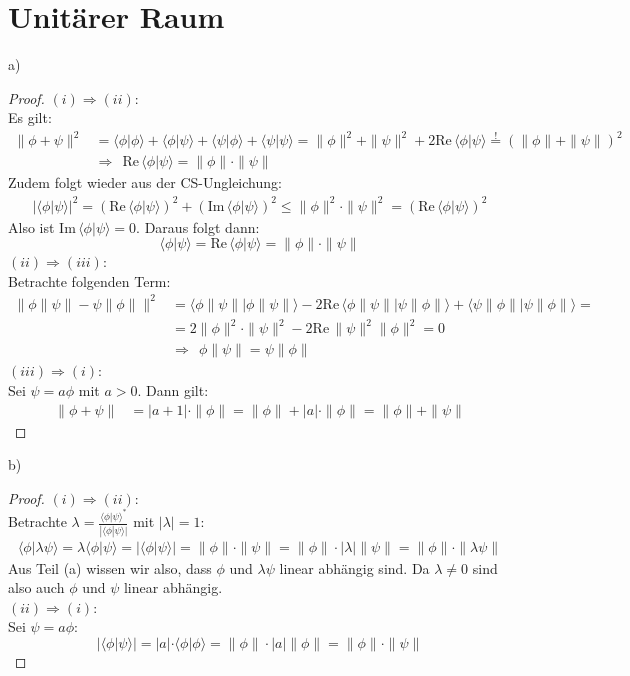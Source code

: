 \documentclass[a4paper,12pt]{article}
\newcommand{\bra}{}
\newcommand{\brak}{}
\newcommand{\kla}{}
\begin{document}
\section{Unitärer Raum}
a)
\begin{proof}
$(i)\Rightarrow(ii)$:\\
Es gilt:
\begin{align*}
\|\phi+\psi\|^2&=\brak\langle {\phi}| {\phi}\rangle+\brak\langle {\phi}| {\psi}\rangle+\brak\langle {\psi}| {\phi}\rangle+\brak\langle {\psi}| {\psi}\rangle=\|\phi\|^2+\|\psi\|^2+2\mathrm{Re\,}\brak\langle {\phi}| {\psi}\rangle\overset{!}{=}\kla\left( {\|\phi\|+\|\psi\|} \right)^2\\
&\Rightarrow\ \ \mathrm{Re\,}\brak\langle {\phi}| {\psi}\rangle=\|\phi\|\cdot\|\psi\|
\end{align*}
Zudem folgt wieder aus der CS-Ungleichung:
\begin{align*}
|\brak\langle {\phi}| {\psi}\rangle|^2=\kla\left( {\mathrm{Re\,}\brak\langle {\phi}| {\psi}\rangle} \right)^2+\kla\left( {\mathrm{Im\,}\brak\langle {\phi}| {\psi}\rangle} \right)^2\le\|\phi\|^2\cdot\|\psi\|^2=(\mathrm{Re\,}\brak\langle {\phi}| {\psi}\rangle)^2
\end{align*}
Also ist $\mathrm{Im\,}\brak\langle {\phi}| {\psi}\rangle=0$. Daraus folgt dann:
$$\brak\langle {\phi}| {\psi}\rangle=\mathrm{Re\,}\brak\langle {\phi}| {\psi}\rangle=\|\phi\|\cdot\|\psi\|$$
$(ii)\Rightarrow(iii)$:\\
Betrachte folgenden Term:
\begin{align*}
\|\phi\|\psi\|-\psi\|\phi\|\|^2&=\brak\langle {\phi\|\psi\|}| {\phi\|\psi\|}\rangle-2\mathrm{Re\,}\bra\langle {\phi\|\psi\| | \psi\|\phi\|}\rangle+\brak\langle {\psi\|\phi\|}| {\psi\|\phi\|}\rangle=\\
&=2\|\phi\|^2\cdot\|\psi\|^2-2\mathrm{Re\,}\|\psi\|^2\|\phi\|^2=0\\
&\Rightarrow\ \ \phi\|\psi\|=\psi\|\phi\|
\end{align*}
$(iii)\Rightarrow(i)$:\\
Sei $\psi=a\phi$ mit $a>0$. Dann gilt:
\begin{align*}
\|\phi+\psi\|&=|a+1|\cdot\|\phi\|=\|\phi\|+|a|\cdot\|\phi\|=\|\phi\|+\|\psi\|
\end{align*}
\end{proof}
b) 
\begin{proof}
$(i)\Rightarrow(ii)$:\\
Betrachte $\lambda=\frac{\brak\langle {\phi}| {\psi}\rangle^\ast}{|\brak\langle {\phi}| {\psi}\rangle|}$ mit $|\lambda|=1$:
\begin{align*}
\brak\langle {\phi}| {\lambda\psi}\rangle=\lambda\brak\langle {\phi}| {\psi}\rangle=|\brak\langle {\phi}| {\psi}\rangle|=\|\phi\|\cdot\|\psi\|=\|\phi\|\cdot|\lambda|\|\psi\|=\|\phi\|\cdot\|\lambda\psi\|
\end{align*}
Aus Teil (a) wissen wir also, dass $\phi$ und $\lambda\psi$ linear abhängig sind. Da $\lambda\neq 0$ sind also auch $\phi$ und $\psi$ linear abhängig.\\
$(ii)\Rightarrow(i)$:\\
Sei $\psi=a\phi$:
$$|\brak\langle {\phi}| {\psi}\rangle|=|a|\cdot\brak\langle {\phi}| {\phi}\rangle=\|\phi\|\cdot |a|\|\phi\|=\|\phi\|\cdot\|\psi\|$$
\end{proof}
\end{document}
